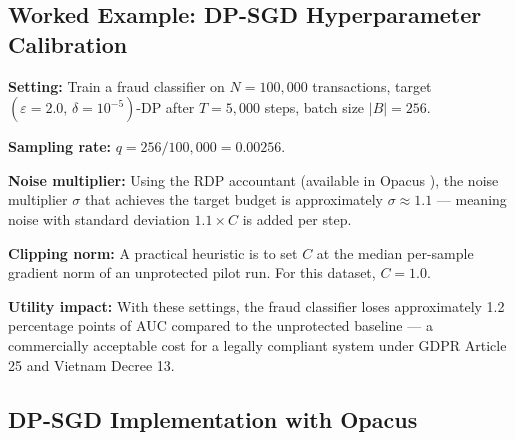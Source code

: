 \subsection{Worked Example: DP-SGD Hyperparameter Calibration}
\label{subsec:dpsgd_example}

\textbf{Setting:} Train a fraud classifier on $N = 100{,}000$ transactions, target $(\varepsilon = 2.0,\, \delta = 10^{-5})$-DP after $T = 5{,}000$ steps, batch size $|B| = 256$.

\textbf{Sampling rate:} $q = 256/100{,}000 = 0.00256$.

\textbf{Noise multiplier:} Using the RDP accountant (available in Opacus \cite{opacus}), the noise multiplier $\sigma$ that achieves the target budget is approximately $\sigma \approx 1.1$ — meaning noise with standard deviation $1.1 \times C$ is added per step.

\textbf{Clipping norm:} A practical heuristic is to set $C$ at the median per-sample gradient norm of an unprotected pilot run. For this dataset, $C = 1.0$.

\textbf{Utility impact:} With these settings, the fraud classifier loses approximately 1.2 percentage points of AUC compared to the unprotected baseline — a commercially acceptable cost for a legally compliant system under GDPR Article 25 and Vietnam Decree 13.

\subsection{DP-SGD Implementation with Opacus}
\label{subsec:dpsgd_code}

